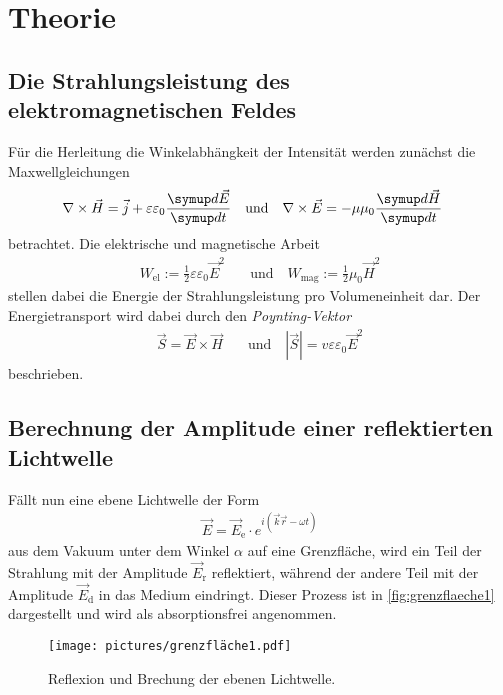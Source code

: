\section{Theorie}
\label{sec:Theorie}


\subsection{Die Strahlungsleistung des elektromagnetischen Feldes}

Für die Herleitung die Winkelabhängkeit der Intensität werden zunächst die Maxwellgleichungen
\begin{align*}
    \nabla \times \vec{H}=\vec{j}+\varepsilon \varepsilon_{0} \frac{ \dif{\vec{E}}}{ \dif{t}} 
    \quad & \text{und} \quad 
    \nabla \times \vec{E}=-\mu \mu_{0} \frac{\dif{\vec{H}}}{\dif{t}} 
\end{align*}
betrachtet. Die elektrische und magnetische Arbeit
\begin{align*}
    W_{\text{el}}   :=  \frac{1}{2} \varepsilon \varepsilon_{0} \vec{E}^{2} 
    \quad & \text{und} \quad 
    W_{\text{mag}}  :=  \frac{1}{2} \mu_{0} \vec{H}^{2}
\end{align*}
stellen dabei die Energie der Strahlungsleistung pro Volumeneinheit dar.
Der Energietransport wird dabei durch den \textit{Poynting-Vektor} 
\begin{align} \label{eq:poynting}
    \vec{S}= \vec{E} \times \vec{H}
    \quad & \text{und} \quad
    |\vec{S}|= v \varepsilon \varepsilon_{0} \vec{E}^{2}
\end{align}
beschrieben.


\subsection{Berechnung der Amplitude einer reflektierten Lichtwelle}

Fällt nun eine ebene Lichtwelle der Form
\begin{align}
    \vec{E} = \vec{E}_\text{e} \cdot e^{i \left( \vec{k} \vec{r} - \omega t \right)}
\end{align}
aus dem Vakuum unter dem Winkel $\alpha$ auf eine Grenzfläche,
wird ein Teil der Strahlung mit der Amplitude $\vec{E}_\text{r}$ reflektiert,
während der andere Teil mit der Amplitude $\vec{E}_\text{d}$ in das Medium eindringt.
Dieser Prozess ist in \autoref{fig:grenzflaeche1} dargestellt und wird als absorptionsfrei angenommen.
\begin{figure}
    \centering
    \texttt{[image: pictures/grenzfläche1.pdf]}
    \caption{Reflexion und Brechung der ebenen Lichtwelle. \cite{v407}}
    \label{fig:grenzflaeche1}
\end{figure}

